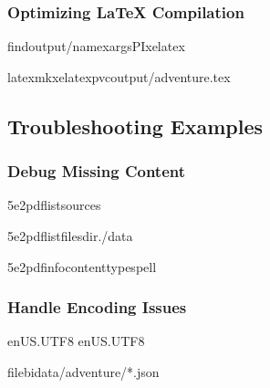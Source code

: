 \documentclass[letterpaper,10pt,english]{sphinxmanual}
\begin{document}
\subsubsection{Optimizing LaTeX Compilation}
\label{\detokenize{user-guide/examples:optimizing-latex-compilation}}
\begin{sphinxVerbatim}[commandchars=\\\{\}]
findoutput/\PYGZhy{}namexargs\PYGZhy{}P\PYGZhy{}Ixelatex

latexmk\PYGZhy{}xelatex\PYGZhy{}pvcoutput/adventure.tex
\end{sphinxVerbatim}


\subsection{Troubleshooting Examples}
\label{\detokenize{user-guide/examples:troubleshooting-examples}}

\subsubsection{Debug Missing Content}
\label{\detokenize{user-guide/examples:debug-missing-content}}
\begin{sphinxVerbatim}[commandchars=\\\{\}]
5e2pdflistsources

5e2pdflistfiles\PYGZhy{}\PYGZhy{}dir./data

5e2pdfinfocontent\PYGZhy{}\PYGZhy{}typespell
\end{sphinxVerbatim}


\subsubsection{Handle Encoding Issues}
\label{\detokenize{user-guide/examples:handle-encoding-issues}}
\begin{sphinxVerbatim}[commandchars=\\\{\}]
en\PYGZus{}US.UTF\PYGZhy{}8
en\PYGZus{}US.UTF\PYGZhy{}8

file\PYGZhy{}bidata/adventure/*.json
\end{sphinxVerbatim}
\end{document}
